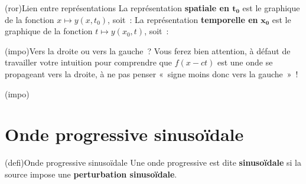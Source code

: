 \documentclass[../../main/main.tex]{subfiles}
\begin{document}

\begin{tcb}[sidebyside](ror){Lien entre représentations}
	La représentation \textbf{spatiale en $\mathbf{t_0}$} est le graphique de la
	fonction $x \mapsto y(x,t_0)$, soit~:
	\psw{%
		\[x\mapsto f(x-ct_0) = g\left(t_0 - \frac{x}{c}\right)\]
	}%
	\vspace{-15pt}
	\tcblower
	La représentation \textbf{temporelle en} $\mathbf{x_0}$ est le graphique de la
	fonction $t \mapsto y(x_0,t)$, soit~:
	\psw{%
		\[t\mapsto f(x_0-ct) = g\left(t - \frac{x_0}{c}\right)\]
	}%
	\vspace{-15pt}
\end{tcb}

\begin{tcb*}(impo){Vers la droite ou vers la gauche~?}
	Vous ferez bien attention, à défaut de travailler votre intuition pour
	comprendre que $f (x-ct)$ est une onde se propageant vers la droite, à ne pas
	penser «~signe moins donc vers la gauche~»~!
	\smallbreak
	\begin{isd}(impo)
		\psw{%
			\[
				f (x+ct) = g \left( t + \frac{x}{c} \right)
			\]
		}
		\vspace{-15pt}
		\tcblower
		\psw{%
			\[
				f (x-ct) = g \left( t - \frac{x}{c} \right)
			\]
		}
		\vspace{-15pt}
	\end{isd}
\end{tcb*}

\section{Onde progressive sinusoïdale}

\begin{tcb}(defi){Onde progressive sinusoïdale}
	Une onde progressive est dite \textbf{sinusoïdale} si la source impose une
	\textbf{perturbation sinusoïdale}.
\end{tcb}

\end{document}

